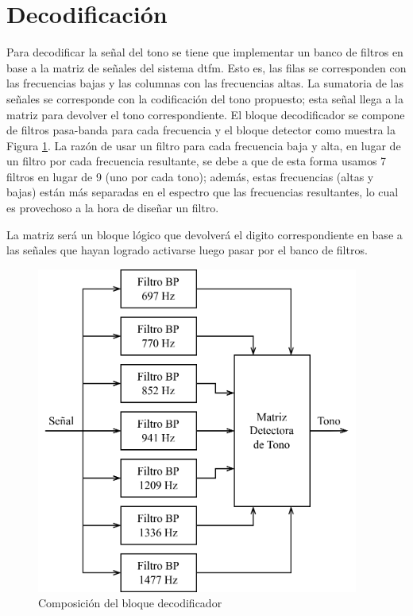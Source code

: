 \section{Decodificación}
Para decodificar la señal del tono se tiene que implementar un banco de filtros en base a la matriz de señales del sistema \gls{dtfm}. Esto es, las filas se corresponden con las frecuencias bajas y las columnas con las frecuencias altas. La sumatoria de las señales se corresponde con la codificación del tono propuesto; esta señal llega a la matriz para devolver el tono correspondiente. El bloque decodificador se compone de filtros pasa-banda para cada frecuencia y el bloque detector como muestra la Figura \ref{fig:diagrama_bloques_decod}. La razón de usar un filtro para cada frecuencia baja y alta, en lugar de un filtro por cada frecuencia resultante, se debe a que de esta forma usamos 7 filtros en lugar de 9 (uno por cada tono); además, estas frecuencias (altas y bajas) están más separadas en el espectro que las frecuencias resultantes, lo cual es provechoso a la hora de diseñar un filtro.

La matriz será un bloque lógico que devolverá el digito correspondiente en base a las señales que hayan logrado activarse luego pasar por el banco de filtros.

\begin{figure}[H]
  \centering
  \includegraphics[width=300pt]{images/diagramas-decodificador.png}
  \caption{Composición del bloque decodificador}
  \label{fig:diagrama_bloques_decod}
\end{figure}

